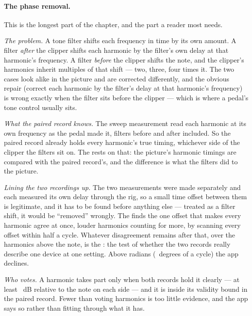 \documentclass[11pt,a4paper]{article}
\begin{document}
\paragraph{The phase removal.} This is the longest part of the chapter,
and the part a reader most needs.

\emph{The problem.} A tone filter shifts each frequency in time by its
own amount. A filter \emph{after} the clipper shifts each harmonic by the
filter's own delay at that harmonic's frequency. A filter \emph{before}
the clipper shifts the note, and the clipper's harmonics inherit multiples
of that shift --- two, three, four times it. The two cases look alike in
the picture and are corrected differently, and the obvious repair
(correct each harmonic by the filter's delay at that harmonic's frequency)
is wrong exactly when the filter sits before the clipper --- which is
where a pedal's tone control usually sits.

\emph{What the paired record knows.} The sweep measurement read each
harmonic at its own frequency as the pedal made it, filters before and
after included. So the paired record already holds every harmonic's true
timing, whichever side of the clipper the filters sit on. The
 rests on that: the picture's harmonic timings are
compared with the paired record's, and the difference is what the
filters did to the picture.

\emph{Lining the two recordings up.} The two measurements were made
separately and each measured its own delay through the rig, so a small
time offset between them is legitimate, and it has to be found before
anything else --- treated as a filter shift, it would be ``removed''
wrongly. The  finds the one offset that makes every
harmonic agree at once, louder harmonics counting for more, by scanning
every offset within half a cycle. Whatever disagreement remains after
that, over the harmonics above the note, is the :
the test of whether the two records really describe one device at one
setting. Above \tcResidualToleranceRad{} radians
(\tcResidualToleranceDeg{}~degrees of a cycle) the app declines.

\emph{Who votes.} A harmonic takes part only when both records hold it
clearly --- at least \tcMagnitudeFloorDB{}~dB relative to the note on each
side --- and it is inside its validity bound in the paired record. Fewer
than \tcMinimumTerms{} voting harmonics is too little evidence, and the
app says so rather than fitting through what it has.
\end{document}
